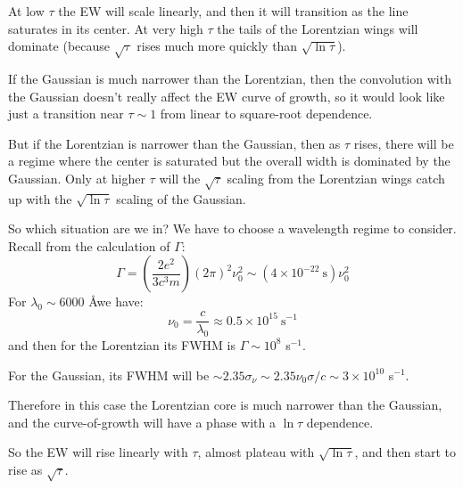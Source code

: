 \documentclass[11pt, preprint]{article}
\begin{document}
\begin{enumerate}
\begin{enumerate}
      \begin{answer}
        At low $\tau$ the EW will scale linearly, and then it will
        transition as the line saturates in its center.  At very high
        $\tau$ the tails of the Lorentzian wings will dominate
        (because $\sqrt{\tau}$ rises much more quickly than $\sqrt{\ln
          \tau}$).

        If the Gaussian is much narrower than the Lorentzian, then the
        convolution with the Gaussian doesn't really affect the EW
        curve of growth, so it would look like just a transition near
        $\tau \sim 1$ from linear to square-root dependence.

        But if the Lorentzian is narrower than the Gaussian, then as
        $\tau$ rises, there will be a regime where the center is
        saturated but the overall width is dominated by the
        Gaussian. Only at higher $\tau$ will the $\sqrt{\tau}$ scaling
        from the Lorentzian wings catch up with the $\sqrt{\ln \tau}$ scaling
        of the Gaussian.

        So which situation are we in? We have to choose a wavelength
        regime to consider. Recall from the calculation of $\Gamma$:
        \begin{equation}
          \Gamma = \left(\frac{2e^2}{3c^3 m}\right) (2\pi)^2 \nu_0^2
          \sim \left(4 \times 10^{-22} \mathrm{~s}\right) \nu_0^2
        \end{equation}
        For $\lambda_0 \sim 6000$ \AA we have:
        \begin{equation}
          \nu_0 = \frac{c}{\lambda_0} \approx 0.5 \times 10^{15}
          \mathrm{~s}^{-1}
        \end{equation}
        and then for the Lorentzian its FWHM is $\Gamma \sim 10^8$
        s$^{-1}$.

        For the Gaussian, its FWHM will be $\sim 2.35 \sigma_\nu \sim
        2.35 \nu_0 \sigma /c \sim 3\times 10^{10}$ s$^{-1}$.

        Therefore in this case the Lorentzian core is much narrower
        than the Gaussian, and the curve-of-growth will have a phase
        with a $\ln \tau$ dependence.

        So the EW will rise linearly with $\tau$, almost plateau with
        $\sqrt{\ln \tau}$, and then start to rise as $\sqrt{\tau}$.
      \end{answer}
  \end{enumerate}
  
\end{enumerate}
\end{document}
